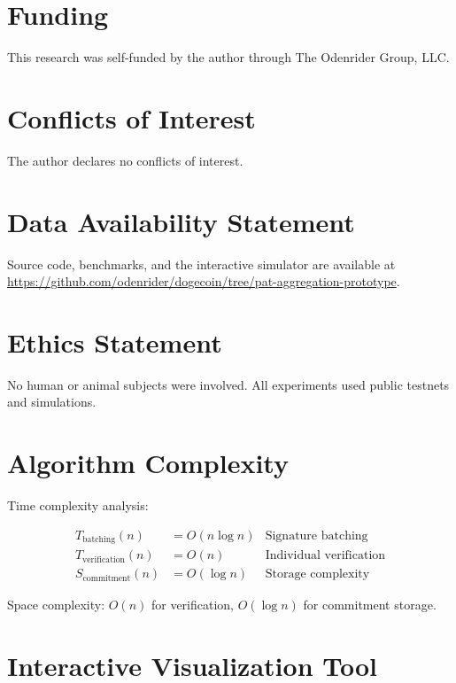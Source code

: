 \documentclass[iacr,final]{iacrtrans}
\begin{document}
\section*{Funding}
This research was self-funded by the author through The Odenrider Group, LLC.

\section*{Conflicts of Interest}
The author declares no conflicts of interest.

\section*{Data Availability Statement}
Source code, benchmarks, and the interactive simulator are available at \\
\url{https://github.com/odenrider/dogecoin/tree/pat-aggregation-prototype}.

\section*{Ethics Statement}
No human or animal subjects were involved. All experiments used public testnets and simulations.



\appendix

\section{Algorithm Complexity}
\label{app:complexity}

Time complexity analysis:

\begin{align}
    T_{\text{batching}}(n) &= O(n \log n) & \text{Signature batching} \\
    T_{\text{verification}}(n) &= O(n) & \text{Individual verification} \\
    S_{\text{commitment}}(n) &= O(\log n) & \text{Storage complexity}
\end{align}

Space complexity: $O(n)$ for verification, $O(\log n)$ for commitment storage.

\section{Interactive Visualization Tool}
\label{app:simulator}
\end{document}
